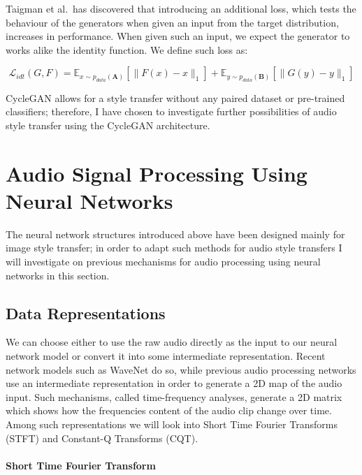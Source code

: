 \documentclass[12pt,a4paper,]{report}
\begin{document}
Taigman et al.~has discovered that introducing an additional loss, which
tests the behaviour of the generators when given an input from the
target distribution, increases in performance. When given such an input,
we expect the generator to works alike the identity function. We define
such loss as:

\begin{equation}
    \mathcal{L}_{idt}(G, F) = \mathbb{E}_{x \sim p_{data}(\mathbf{A})}[\|F(x) - x\|_1] + \mathbb{E}_{y \sim p_{data}(\mathbf{B})}[\|G(y) - y\|_1]
\end{equation}

CycleGAN allows for a style transfer without any paired dataset or
pre-trained classifiers; therefore, I have chosen to investigate further
possibilities of audio style transfer using the CycleGAN architecture.

\hypertarget{audio-signal-processing-using-neural-networks}{%
\section{Audio Signal Processing Using Neural
Networks}\label{audio-signal-processing-using-neural-networks}}

The neural network structures introduced above have been designed mainly
for image style transfer; in order to adapt such methods for audio style
transfers I will investigate on previous mechanisms for audio processing
using neural networks in this section.

\hypertarget{data-representations}{%
\subsection{Data Representations}\label{data-representations}}

We can choose either to use the raw audio directly as the input to our
neural network model or convert it into some intermediate
representation. Recent network models such as WaveNet do so, while
previous audio processing networks use an intermediate representation in
order to generate a 2D map of the audio input. Such mechanisms, called
time-frequency analyses, generate a 2D matrix which shows how the
frequencies content of the audio clip change over time. Among such
representations we will look into Short Time Fourier Transforms (STFT)
and Constant-Q Transforms (CQT).

\paragraph{Short Time Fourier Transform}
\end{document}
